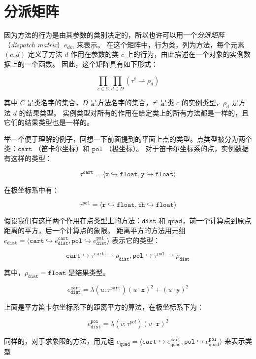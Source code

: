 \section{分派矩阵}
因为方法的行为是由其参数的类别决定的，所以也许可以用一个\textit{分派矩阵}（\textit{dispatch matrix}）$ e_{dm} $ 来表示。
在这个矩阵中，行为类，列为方法，每个元素 $ (c, d) $ 定义了方法 $d$ 作用在参数的类 $c$ 上的行为，由此描述在一个对象的实例数据上的一个函数。
因此，这个矩阵具有如下形式：

$$ \prod_{c \in C} \prod_{d \in D} (\tau^{c} \rightharpoonup \rho_{d}) $$

其中 $C$ 是类名字的集合，$D$ 是方法名字的集合，$\tau^c$ 是类 $c$ 的实例类型，$ \rho_{d} $ 是方法 $d$ 的结果类型。
实例类型对所有的作用在给定类上的所有方法都是一样的，且它们的结果类型也是一样的。

举一个便于理解的例子，回想一下前面提到的平面上点的类型。点类型被分为两个类：$ \mathtt{cart} $ （笛卡尔坐标）和 $ \mathtt{pol} $ （极坐标）。
对于笛卡尔坐标系的点，实例数据有这样的类型：

$$ \tau^{\mathtt{cart}} =  \langle \mathtt{x} \hookrightarrow \mathtt{float}, \mathtt{y} \hookrightarrow \mathtt{float} \rangle $$

在极坐标系中有：

$$ \tau^{\mathtt{pol}} =  \langle \mathtt{r} \hookrightarrow \mathtt{float}, \mathtt{th} \hookrightarrow \mathtt{float} \rangle $$

假设我们有这样两个作用在点类型上的方法：$ \mathtt{dist} $ 和 $ \mathtt{quad} $，前一个计算点到原点距离的平方，后一个计算点的象限。
距离平方的方法用元组 $ e_{\mathtt{dist}} = \langle \mathtt{cart} \hookrightarrow e^{\mathtt{cart}}_{\mathtt{dist}}, \mathtt{pol} \hookrightarrow e^{\mathtt{pol}}_{\mathtt{dist}} \rangle $ 表示它的类型：

$$ \mathtt{cart} \hookrightarrow \tau^{\mathtt{cart}} \rightharpoonup \rho_{\mathtt{dist}}, \mathtt{pol} \hookrightarrow \tau^{\mathtt{pol}} \rightharpoonup \rho_{\mathtt{dist}} $$

其中，$ \rho_{\mathtt{dist}} = \mathtt{float} $ 是结果类型。

$$ e^{\mathtt{cart}}_{\mathtt{dist}} = \lambda (u : \tau^{\mathtt{cart}})(u \cdot \mathtt{x})^2 + (u \cdot \mathtt{y})^2 $$

上面是平方笛卡尔坐标系下的距离平方的算法，在极坐标系下为：

$$ e^{\mathtt{pol}}_{\mathtt{dist}} = \lambda (v : \tau^{pol})(v \cdot \mathtt{r})^2 $$

同样的，对于求象限的方法，用元组 $ e_{\mathtt{quad}} = \langle \mathtt{cart} \hookrightarrow e^{\mathtt{cart}}_{\mathtt{quad}}, \mathtt{pol} \hookrightarrow e^{\mathtt{pol}}_{\mathtt{quad}} \rangle$ 来表示类型

